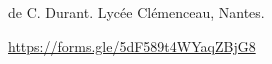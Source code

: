 \nRessources de C. Durant. Lycée Clémenceau, Nantes.
\begin{center}
\end{center}

\url{https://forms.gle/5dF589t4WYaqZBjG8}

